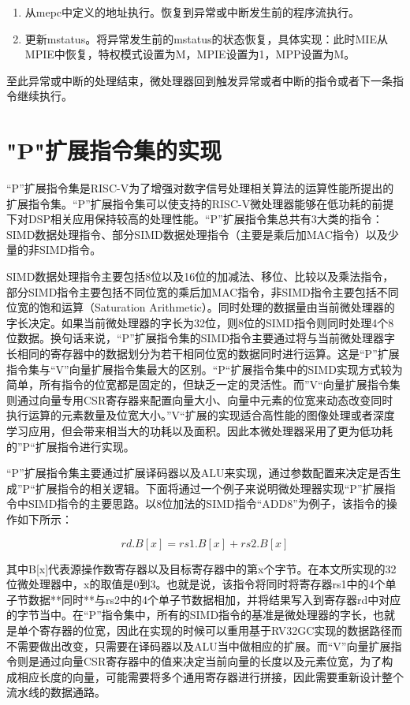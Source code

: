 \begin{enumerate}
\item 从mepc中定义的地址执行。恢复到异常或中断发生前的程序流执行。
\item 更新mstatus。将异常发生前的mstatus的状态恢复，具体实现：此时MIE从MPIE中恢复，特权模式设置为M，MPIE设置为1，MPP设置为M。
\end{enumerate}

至此异常或中断的处理结束，微处理器回到触发异常或者中断的指令或者下一条指令继续执行。

\section{"P"扩展指令集的实现}

“P”扩展指令集是RISC-V为了增强对数字信号处理相关算法的运算性能所提出的扩展指令集。“P”扩展指令集可以使支持的RISC-V微处理器能够在低功耗的前提下对DSP相关应用保持较高的处理性能。“P”扩展指令集总共有3大类的指令：SIMD数据处理指令、部分SIMD数据处理指令（主要是乘后加MAC指令）以及少量的非SIMD指令。

SIMD数据处理指令主要包括8位以及16位的加减法、移位、比较以及乘法指令，部分SIMD指令主要包括不同位宽的乘后加MAC指令，非SIMD指令主要包括不同位宽的饱和运算（Saturation Arithmetic）。同时处理的数据量由当前微处理器的字长决定。如果当前微处理器的字长为32位，则8位的SIMD指令则同时处理4个8位数据。换句话来说，“P”扩展指令集的SIMD指令主要通过将与当前微处理器字长相同的寄存器中的数据划分为若干相同位宽的数据同时进行运算。这是“P”扩展指令集与“V”向量扩展指令集最大的区别。“P“扩展指令集中的SIMD实现方式较为简单，所有指令的位宽都是固定的，但缺乏一定的灵活性。而”V“向量扩展指令集则通过向量专用CSR寄存器来配置向量大小、向量中元素的位宽来动态改变同时执行运算的元素数量及位宽大小。”V“扩展的实现适合高性能的图像处理或者深度学习应用，但会带来相当大的功耗以及面积。因此本微处理器采用了更为低功耗的”P“扩展指令进行实现。

“P”扩展指令集主要通过扩展译码器以及ALU来实现，通过参数配置来决定是否生成”P“扩展指令的相关逻辑。下面将通过一个例子来说明微处理器实现“P”扩展指令中SIMD指令的主要思路。以8位加法的SIMD指令“ADD8”为例子，该指令的操作如下所示：

\begin{equation}
rd.B[x] = rs1.B[x] + rs2.B[x]
\end{equation}

其中B[x]代表源操作数寄存器以及目标寄存器中的第x个字节。在本文所实现的32位微处理器中，x的取值是0到3。也就是说，该指令将同时将寄存器rs1中的4个单子节数据**同时**与rs2中的4个单子节数据相加，并将结果写入到寄存器rd中对应的字节当中。在“P”指令集中，所有的SIMD指令的基准是微处理器的字长，也就是单个寄存器的位宽，因此在实现的时候可以重用基于RV32GC实现的数据路径而不需要做出改变，只需要在译码器以及ALU当中做相应的扩展。而“V”向量扩展指令则是通过向量CSR寄存器中的值来决定当前向量的长度以及元素位宽，为了构成相应长度的向量，可能需要将多个通用寄存器进行拼接，因此需要重新设计整个流水线的数据通路。


